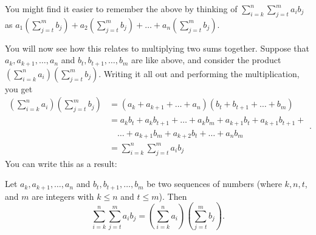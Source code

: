 \documentclass[
  12pt,
  a4paper, oneside]{starmastarticle}
\begin{document}
\begin{tcolorbox}[enhanced jigsaw, toprule=.15mm, colback=white, opacityback=0, breakable, colframe=quarto-callout-tip-color-frame, title=\textcolor{quarto-callout-tip-color}{\faLightbulb}\hspace{0.5em}{Tip}, left=2mm, titlerule=0mm, bottomtitle=1mm, colbacktitle=quarto-callout-tip-color!10!white, leftrule=.75mm, toptitle=1mm, arc=.35mm, opacitybacktitle=0.6, rightrule=.15mm, coltitle=black, bottomrule=.15mm]
You might find it easier to remember the above by thinking of
\(\sum_{i=k}^n\sum_{j=t}^m a_i b_j\) as
\(a_1(\sum_{j=t}^mb_j) + a_2(\sum_{j=t}^mb_j) + \ldots + a_n(\sum_{j=t}^mb_j).\)
\end{tcolorbox}

You will now see how this relates to multiplying two sums together.
Suppose that \(a_k,a_{k+1},\ldots,a_n\) and \(b_t,b_{t+1},\ldots,b_m\)
are like above, and consider the product
\((\sum_{i=k}^na_i)(\sum_{j=t}^mb_j)\). Writing it all out and
performing the multiplication, you get
\[\begin{equation}\begin{split} (\sum_{i=k}^na_i)(\sum_{j=t}^mb_j) &= (a_k+a_{k+1}+\ldots+a_n)(b_t + b_{t+1}+\ldots+b_m) \\ &= a_kb_t + a_kb_{t+1} + \ldots + a_kb_m + a_{k+1}b_t + a_{k+1}b_{t+1} + \\ & \quad \ldots + a_{k+1}b_m + a_{k+2}b_t + \ldots + a_nb_m \\ &= \sum_{i=k}^n\sum_{j=t}^m a_i b_j\end{split}.\end{equation}\]
You can write this as a result:

\begin{tcolorbox}[enhanced jigsaw, toprule=.15mm, colback=white, opacityback=0, breakable, colframe=quarto-callout-note-color-frame, title=\textcolor{quarto-callout-note-color}{\faInfo}\hspace{0.5em}{Double sums and products of two sums}, left=2mm, titlerule=0mm, bottomtitle=1mm, colbacktitle=quarto-callout-note-color!10!white, leftrule=.75mm, toptitle=1mm, arc=.35mm, opacitybacktitle=0.6, rightrule=.15mm, coltitle=black, bottomrule=.15mm]
Let \(a_{k},a_{k+1},\ldots,a_n\) and \(b_t,b_{t+1},\ldots,b_m\) be two
sequences of numbers (where \(k,n,t\), and \(m\) are integers with
\(k \leq n\) and \(t \leq m\)). Then
\[\sum_{i=k}^n\sum_{j=t}^m a_i b_j = (\sum_{i=k}^na_i)(\sum_{j=t}^mb_j).\]
\end{tcolorbox}
\end{document}
